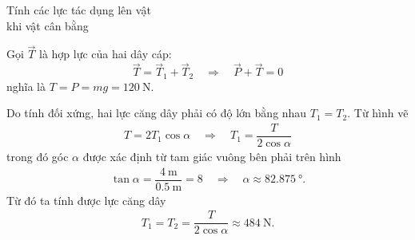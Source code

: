 \begin{dang}{Tính các lực tác dụng lên vật \\khi vật cân bằng}
{		Gọi $\vec T$ là hợp lực của hai dây cáp:
		$$\vec{T}=\vec{T}_1+\vec{T}_2\quad\Rightarrow\quad \vec{P}+\vec{T}=0$$
		nghĩa là $T=P=mg=\SI{120}{\newton}$.
		
		Do tính đối xứng, hai lực căng dây phải có độ lớn bằng nhau $T_1=T_2$. Từ hình vẽ 
			\begin{align*}
				T=2T_1\cos \alpha\quad\Rightarrow\quad T_1=\dfrac{T}{2\cos\alpha}
			\end{align*}
		trong đó góc $\alpha$ được xác định từ tam giác vuông bên phải trên hình
			\begin{align*}
				\tan\alpha=\dfrac{\SI{4}{\meter}}{\SI{0.5}{\meter}}=8\quad\Rightarrow\quad \alpha\approx\SI{82.875}{\degree}. 
			\end{align*}
		Từ đó ta tính được lực căng dây
			\begin{align*}
				T_1=T_2=\dfrac{T}{2\cos\alpha}\approx \SI{484}{\newton}.
			\end{align*}		
	}
	
	
\end{dang}
